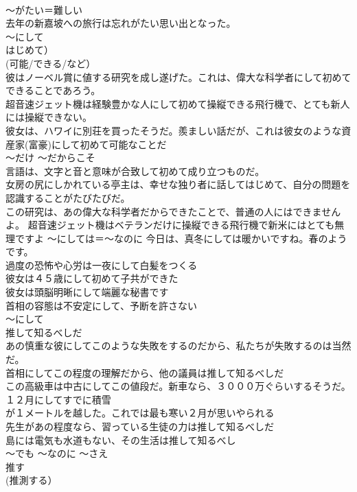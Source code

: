 \documentclass[8pt]{extreport}
\begin{document}
\begin{CJK}{UTF8}{min}
\\	～がたい＝難しい 
\\	去年の新嘉坡への旅行は忘れがたい思い出となった。
\\	～にして 
\\	はじめて） 
\\	(可能/できる/など）	
\\	彼はノーベル賞に値する研究を成し遂げた。これは、偉大な科学者にして初めてできることであろう。 
\\	超音速ジェット機は経験豊かな人にして初めて操縦できる飛行機で、とても新人には操縦できない。 
\\	彼女は、ハワイに別荘を買ったそうだ。羨ましい話だが、これは彼女のような資産家(富豪)にして初めて可能なことだ 
\\	～だけ ～だからこそ 
\\	言語は、文字と音と意味が合致して初めて成り立つものだ。
\\	女房の尻にしかれている亭主は、幸せな独り者に話してはじめて、自分の問題を認識することがたびたびだ。 
\\	この研究は、あの偉大な科学者だからできたことで、普通の人にはできませんよ。 超音速ジェット機はベテランだけに操縦できる飛行機で新米にはとても無理ですよ ～にしては＝～なのに 今日は、真冬にしては暖かいですね。春のようです。 
\\	過度の恐怖や心労は一夜にして白髪をつくる 
\\	彼女は４５歳にして初めて子共ができた　
\\	彼女は頭脳明晰にして端麗な秘書です 
\\	首相の容態は不安定にして、予断を許さない 
\\	～にして 
\\	推して知るべしだ	
\\	あの慎重な彼にしてこのような失敗をするのだから、私たちが失敗するのは当然だ。 
\\	首相にしてこの程度の理解だから、他の議員は推して知るべしだ 
\\	この高級車は中古にしてこの値段だ。新車なら、３０００万ぐらいするそうだ。 
\\	１２月にしてすでに積雪
\\	が１メートルを越した。これでは最も寒い２月が思いやられる 
\\	先生があの程度なら、習っている生徒の力は推して知るべしだ 
\\	島には電気も水道もない、その生活は推して知るべし　 
\\	～でも ～なのに ～さえ 
\\	推す 
\\	(推測する） 

\end{CJK}
\end{document}
